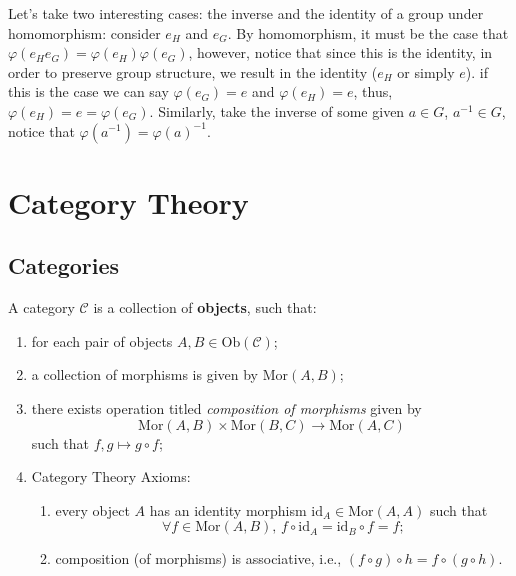 \documentclass[12pt,oneside]{report}
\begin{document}
Let's take two interesting cases: the inverse and the identity of a group under homomorphism: consider \( e_H \) and \( e_G \). By homomorphism, it must be the case that \( \varphi (e_He_G)=\varphi (e_H) \varphi (e_G) \), however, notice that since this is the identity, in order to preserve group structure, we result in the identity (\( e_H \) or simply \( e \)). if this is the case we can say \( \varphi (e_G)=e \) and \( \varphi (e_H)=e \), thus, \( \varphi (e_H)=e=\varphi (e_G) \). Similarly, take the inverse of some given \( a \in  G \), \( a^{-1} \in  G \), notice that \( \varphi (a^{-1})=\varphi (a)^{-1} \).



\section{Category Theory}


\subsection{Categories}

\begin{definition}[Category]
  A category \( \mathscr{C} \) is a collection of \textbf{objects}, such that:

  \begin{enumerate}[(i.)]
    \item for each pair of objects \( A,B\in  \text{Ob}(\mathscr{C} )   \);
    \item a collection of morphisms is given by \( \text{Mor}(A,B) \);
    \item there exists operation titled \textit{composition of morphisms} given by \[ \text{Mor}(A,B)\times \text{Mor}(B,C) \to \text{Mor}(A,C) \] such that \( f,g \mapsto g \circ f \);
    \item Category Theory Axioms: \begin{enumerate}
        \item every object \( A \) has an identity morphism \( \text{id}_A \in  \text{Mor}(A,A) \) such that \[ \forall f \in  \text{Mor}(A,B), \, f \circ \text{id}_A=\text{id}_B\circ f=f ;\]
        \item composition (of morphisms) is associative, i.e., \( (f\circ g)\circ h= f\circ (g\circ h) \).
    \end{enumerate}
\end{enumerate}

\end{definition}
\end{document}
